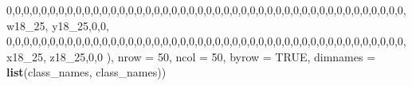 \documentclass[]{article}
\newenvironment{Shaded}{\begin{snugshade}}{\end{snugshade}}
\newcommand{\DataTypeTok}[1]{\textcolor[rgb]{0.13,0.29,0.53}{#1}}
\newcommand{\DecValTok}[1]{\textcolor[rgb]{0.00,0.00,0.81}{#1}}
\newcommand{\KeywordTok}[1]{\textcolor[rgb]{0.13,0.29,0.53}{\textbf{#1}}}
\newcommand{\NormalTok}[1]{#1}
\newcommand{\OtherTok}[1]{\textcolor[rgb]{0.56,0.35,0.01}{#1}}
\begin{document}
\begin{Shaded}
\begin{Highlighting}[]
\DecValTok{0}\NormalTok{,}\DecValTok{0}\NormalTok{,}\DecValTok{0}\NormalTok{,}\DecValTok{0}\NormalTok{,}\DecValTok{0}\NormalTok{,}\DecValTok{0}\NormalTok{,}\DecValTok{0}\NormalTok{,}\DecValTok{0}\NormalTok{,}\DecValTok{0}\NormalTok{,}\DecValTok{0}\NormalTok{,}\DecValTok{0}\NormalTok{,}\DecValTok{0}\NormalTok{,}\DecValTok{0}\NormalTok{,}\DecValTok{0}\NormalTok{,}\DecValTok{0}\NormalTok{,}\DecValTok{0}\NormalTok{,}\DecValTok{0}\NormalTok{,}\DecValTok{0}\NormalTok{,}\DecValTok{0}\NormalTok{,}\DecValTok{0}\NormalTok{,}\DecValTok{0}\NormalTok{,}\DecValTok{0}\NormalTok{,}\DecValTok{0}\NormalTok{,}\DecValTok{0}\NormalTok{,}\DecValTok{0}\NormalTok{,}\DecValTok{0}\NormalTok{,}\DecValTok{0}\NormalTok{,}\DecValTok{0}\NormalTok{,}\DecValTok{0}\NormalTok{,}\DecValTok{0}\NormalTok{,}\DecValTok{0}\NormalTok{,}\DecValTok{0}\NormalTok{,}\DecValTok{0}\NormalTok{,}\DecValTok{0}\NormalTok{,}\DecValTok{0}\NormalTok{,}\DecValTok{0}\NormalTok{,}\DecValTok{0}\NormalTok{,}\DecValTok{0}\NormalTok{,}\DecValTok{0}\NormalTok{,}\DecValTok{0}\NormalTok{,}\DecValTok{0}\NormalTok{,}\DecValTok{0}\NormalTok{,}\DecValTok{0}\NormalTok{,}\DecValTok{0}\NormalTok{,}\DecValTok{0}\NormalTok{,}\DecValTok{0}\NormalTok{,w18_}\DecValTok{25}\NormalTok{, y18_}\DecValTok{25}\NormalTok{,}\DecValTok{0}\NormalTok{,}\DecValTok{0}\NormalTok{,}
\DecValTok{0}\NormalTok{,}\DecValTok{0}\NormalTok{,}\DecValTok{0}\NormalTok{,}\DecValTok{0}\NormalTok{,}\DecValTok{0}\NormalTok{,}\DecValTok{0}\NormalTok{,}\DecValTok{0}\NormalTok{,}\DecValTok{0}\NormalTok{,}\DecValTok{0}\NormalTok{,}\DecValTok{0}\NormalTok{,}\DecValTok{0}\NormalTok{,}\DecValTok{0}\NormalTok{,}\DecValTok{0}\NormalTok{,}\DecValTok{0}\NormalTok{,}\DecValTok{0}\NormalTok{,}\DecValTok{0}\NormalTok{,}\DecValTok{0}\NormalTok{,}\DecValTok{0}\NormalTok{,}\DecValTok{0}\NormalTok{,}\DecValTok{0}\NormalTok{,}\DecValTok{0}\NormalTok{,}\DecValTok{0}\NormalTok{,}\DecValTok{0}\NormalTok{,}\DecValTok{0}\NormalTok{,}\DecValTok{0}\NormalTok{,}\DecValTok{0}\NormalTok{,}\DecValTok{0}\NormalTok{,}\DecValTok{0}\NormalTok{,}\DecValTok{0}\NormalTok{,}\DecValTok{0}\NormalTok{,}\DecValTok{0}\NormalTok{,}\DecValTok{0}\NormalTok{,}\DecValTok{0}\NormalTok{,}\DecValTok{0}\NormalTok{,}\DecValTok{0}\NormalTok{,}\DecValTok{0}\NormalTok{,}\DecValTok{0}\NormalTok{,}\DecValTok{0}\NormalTok{,}\DecValTok{0}\NormalTok{,}\DecValTok{0}\NormalTok{,}\DecValTok{0}\NormalTok{,}\DecValTok{0}\NormalTok{,}\DecValTok{0}\NormalTok{,}\DecValTok{0}\NormalTok{,}\DecValTok{0}\NormalTok{,}\DecValTok{0}\NormalTok{,x18_}\DecValTok{25}\NormalTok{, z18_}\DecValTok{25}\NormalTok{,}\DecValTok{0}\NormalTok{,}\DecValTok{0}
\NormalTok{),  }
\DataTypeTok{nrow =} \DecValTok{50}\NormalTok{, }\DataTypeTok{ncol =} \DecValTok{50}\NormalTok{, }\DataTypeTok{byrow =} \OtherTok{TRUE}\NormalTok{, }\DataTypeTok{dimnames =} \KeywordTok{list}\NormalTok{(class_names, class_names))}



\end{Highlighting}
\end{Shaded}
\end{document}
